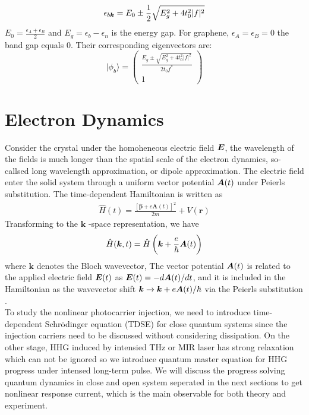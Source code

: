 \begin{equation}
\epsilon_{b\boldsymbol{k}}=E_{0} \pm \frac{1}{2} \sqrt{E_{g}^{2}+4t_{0}^{2}|f|^{2}}
\label{eigenvalues}
\end{equation}
$E_{0}=\frac{\epsilon_{A}+\epsilon_{B}}{2}$ and $E_{g}=\epsilon_{b}-\epsilon_{n}$ is the energy gap. For graphene, $\epsilon_{A} = \epsilon_{B} =0$ the band gap equals 0.
Their corresponding eigenvectors are:
\begin{equation}
    |\phi_{b}\rangle  =\left(\begin{array}{cc}
 \frac{E_{g} \pm \sqrt{E_{g}^{2}+4t_{0}^{2}|f|^{2}}}{2t_{0} f^*}\\
1
\end{array}\right)
\label{eqn:eigenvector}
\end{equation}

\section{Electron Dynamics}
Consider the crystal under the homoheneous electric field $\boldsymbol {E}$, the wavelength of the fields
is much longer than the spatial scale of the electron dynamics, so-callsed long wavelength approximation, or dipole approximation. The electric field enter the solid system through a uniform
vector potential $\boldsymbol {A} (t)$ under Peierls substitution\cite{hofstadter1976energy}. The time-dependent Hamiltonian is written as
\begin{align}
\hat{H}(t)=\frac{[\hat{\boldsymbol{p}}+e \boldsymbol{A}(t)]^{2}}{2 m}+V(\boldsymbol{r})
\end{align}
Transforming to the $\boldsymbol{k}$ -space representation, we have
\begin{equation}
     \hat{H}(\boldsymbol{k}, t)=\hat{H}\left(\boldsymbol{k}+\frac{e}{\hbar} \boldsymbol{A}(t)\right)
     \label{eqn:vTD}
\end{equation}
where $\boldsymbol k$ denotes the Bloch wavevector, The vector potential $\boldsymbol A(t)$ is related to the applied electric field $\boldsymbol E(t)$ as $\boldsymbol E(t)=-d\boldsymbol A(t)/dt$, and it is included in the Hamiltonian as the wavevector shift $\boldsymbol k \rightarrow \boldsymbol k + e\boldsymbol A(t)/\hbar$ via the Peierls substitution  \cite{hofstadter1976energy}.\\

To study the nonlinear photocarrier injection, we need to introduce time-dependent Schr\"odinger
equation (\gls {TDSE}) for close quantum systems since the injection carriers need to be discussed
without considering dissipation. On the other stage, HHG induced by intensied THz or MIR laser has
strong relaxation which can not be ignored so we introduce quantum master equation for HHG progress
under intensed long-term pulse. We will discuss the progress solving quantum dynamics in close and
open system seperated in the next sections to get nonlinear response current, which is the main
observable for both theory and experiment. 

